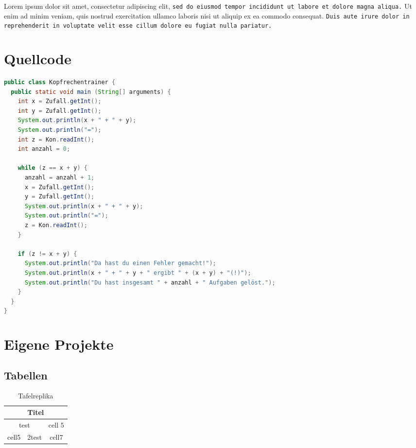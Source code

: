 \documentclass[12pt, a4paper]{article} %
\begin{document}
Lorem ipsum dolor sit amet, \textsf{consectetur adipiscing elit,} \texttt{sed do eiusmod tempor incididunt ut labore et dolore magna aliqua.} \textrm{Ut enim ad minim veniam,} \textsf{quis nostrud exercitation ullamco laboris nisi ut aliquip ex ea commodo consequat.} \texttt{Duis aute irure dolor in reprehenderit in voluptate velit esse cillum dolore eu fugiat nulla pariatur.}


\section{Quellcode}



\begin{lstlisting}[language=Java , caption=Kopfrechentrainer]
public class Kopfrechentrainer {
  public static void main (String[] arguments) {
    int x = Zufall.getInt();
    int y = Zufall.getInt();
    System.out.println(x + " + " + y);
    System.out.println("=");
    int z = Kon.readInt();
    int anzahl = 0;
    
    while (z == x + y) {
      anzahl = anzahl + 1;
      x = Zufall.getInt();
      y = Zufall.getInt();
      System.out.println(x + " + " + y);
      System.out.println("=");
      z = Kon.readInt();
    }
    
    if (z != x + y) {
      System.out.println("Da hast du einen Fehler gemacht!");
      System.out.println(x + " + " + y + " ergibt " + (x + y) + "(!)");
      System.out.println("Du hast insgesamt " + anzahl + " Aufgaben gelöst.");
    }
  }
}
\end{lstlisting}

\newpage
\section{Eigene Projekte}
\subsection{Tabellen}

\begin{table}[h]
    \centering
    \begin{tabular}{|c|c|c|}
    \hline 
    \multicolumn{3}{|c|}{Titel} \\
    \hline
    \multicolumn{2}{|c|}{test} & cell 5 \\
    \hline
    cell5 & 2test & cell7 \\
    \hline
    \end{tabular}
    \caption{Tafelreplika}
    \label{tab:tafelreplika}
\end{table}
\end{document}

